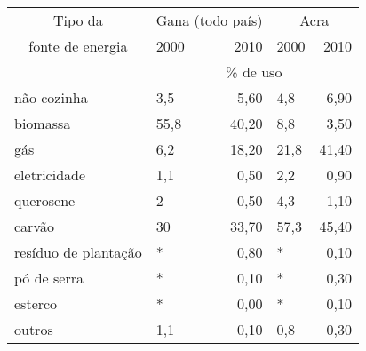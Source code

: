\begin{tabular}{llrlr}
  \hline
  \multicolumn{1}{c}{Tipo da} & \multicolumn{2}{c}{Gana (todo país)} & \multicolumn{2}{c}{Acra}                                                           \\
  \multicolumn{1}{c}{fonte de energia} & 2000 & 2010 &  2000 & 2010  \\ 
 \hline & \multicolumn{4}{c}{\% de uso} \\ 
  \hline
  não cozinha           & 3,5 & 5,60 & 4,8 & 6,90 \\ 
  biomassa              & 55,8 & 40,20 & 8,8 & 3,50 \\ 
  gás                   & 6,2 & 18,20 & 21,8 & 41,40 \\ 
  eletricidade          & 1,1 & 0,50 & 2,2 & 0,90 \\ 
  querosene             & 2 & 0,50 & 4,3 & 1,10 \\ 
  carvão                & 30 & 33,70 & 57,3 & 45,40 \\ 
  resíduo de plantação  & * & 0,80 & * & 0,10 \\ 
  pó de serra           & * & 0,10 & * & 0,30 \\ 
  esterco               & * & 0,00 & * & 0,10 \\ 
  outros                & 1,1 & 0,10 & 0,8 & 0,30 \\ 
  \hline
\end{tabular}

